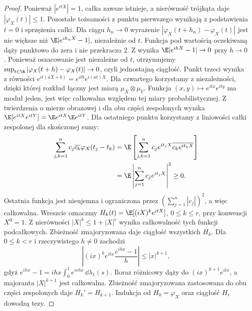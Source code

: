 \begin{proof}
Ponieważ $|e^{itX}|=1$, całka zawsze istnieje,
a nierówność trójkąta daje $|\varphi_X(t)|\leq1$.
Pozostałe tożsamości z punktu pierwszego wynikają
z podstawienia $t=0$ i sprzężenia całki.
Dla ciągu $h_n\to0$ wyrażenie
$|\varphi_X(t+h_n)-\varphi_X(t)|$
jest nie większe niż $\E|e^{ih_nX}-1|$, niezależnie od $t$.
Funkcja pod wartością oczekiwaną dąży punktowo do zera
i nie przekracza $2$. Z
wynika $\E|e^{ihX}-1|\to0$ przy $h\to0$.
Ponieważ oszacowanie jest niezależne od $t$, otrzymujemy
$\sup_{t\in\R}|\varphi_X(t+h)-\varphi_X(t)|\to0$,
czyli jednostajną ciągłość. Punkt trzeci wynika z równości
$e^{it(aX+b)}=e^{itb}e^{i(at)X}$.
Dla czwartego korzystamy z niezależności, dzięki której
rozkład łączny jest miarą $\mu_X\otimes\mu_Y$.
Funkcja $(x,y)\mapsto e^{itx}e^{ity}$ ma moduł jeden,
jest więc całkowalna względem tej miary probabilistycznej.
Z twierdzenia o mierze obrazowej i
dla obu części zespolonych wynika
$\E[e^{itX}e^{itY}]=\E e^{itX}\E e^{itY}$.
Dla ostatniego punktu korzystamy z liniowości całki
zespolonej dla skończonej sumy:
\[
\begin{aligned}
\sum_{j,k=1}^n c_j\overline{c_k}\varphi_X(t_j-t_k)
&=\E\left[\sum_{j,k=1}^n
c_je^{it_jX}\overline{c_ke^{it_kX}}\right]\\
&=\E\left|\sum_{j=1}^n c_je^{it_jX}\right|^2\geq0.
\end{aligned}
\]
Ostatnia funkcja jest nieujemna i ograniczona przez
$(\sum_{j=1}^n|c_j|)^2$, a więc całkowalna.
Wreszcie oznaczmy $H_k(t)=\E[(iX)^ke^{itX}]$,
$0\leq k\leq r$, przy konwencji $X^0=1$.
Z nierówności $|X|^k\leq1+|X|^r$ wynika całkowalność
tych funkcji podcałkowych. Zbieżność zmajoryzowana
daje ciągłość wszystkich $H_k$.
Dla $0\leq k<r$ i rzeczywistego $h\ne0$ zachodzi
\[
\left|(ix)^k e^{itx}\frac{e^{ihx}-1}{h}\right|
\leq |x|^{k+1},
\]
gdyż $e^{ihx}-1=ihx\int_0^1e^{ishx}\,\dd\lambda_1(s)$.
Iloraz różnicowy dąży do $(ix)^{k+1}e^{itx}$,
a majoranta $|X|^{k+1}$ jest całkowalna.
Zbieżność zmajoryzowana zastosowana do obu części
zespolonych daje $H_k'=H_{k+1}$.
Indukcja od $H_0=\varphi_X$ oraz ciągłość $H_r$
dowodzą tezy.
\end{proof}

